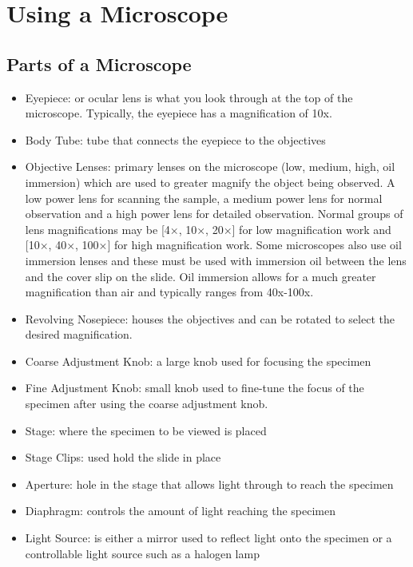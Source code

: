 \chapter{Using a Microscope}

\section{Parts of a Microscope}

\begin{itemize}

\item{Eyepiece: or ocular lens is what you look through at the top of the microscope. Typically, the eyepiece has a magnification of 10x.}

\item{Body Tube: tube that connects the eyepiece to the objectives}

\item{Objective Lenses: primary lenses on the microscope (low, medium, high, oil immersion) which are used to greater magnify the object being observed. A low power lens for scanning the sample, a medium power lens for normal observation and a high power lens for detailed observation. Normal groups of lens magnifications may be [4×, 10×, 20×] for low magnification work and [10×, 40×, 100×] for high magnification work. Some microscopes also use oil immersion lenses and these must be used with immersion oil between the lens and the cover slip on the slide. Oil immersion allows for a much greater magnification than air and typically ranges from 40x-100x.}

\item{Revolving Nosepiece: houses the objectives and can be rotated to select the desired magnification.}

\item{Coarse Adjustment Knob: a large knob used for focusing the specimen}

\item{Fine Adjustment Knob: small knob used to fine-tune the focus of the specimen after using the coarse adjustment knob.}

\item{Stage: where the specimen to be viewed is placed}

\item{Stage Clips: used hold the slide in place}

\item{Aperture: hole in the stage that allows light through to reach the specimen}

\item{Diaphragm: controls the amount of light reaching the specimen}

\item{Light Source: is either a mirror used to reflect light onto the specimen or a controllable light source such as a halogen lamp}

\end{itemize}

